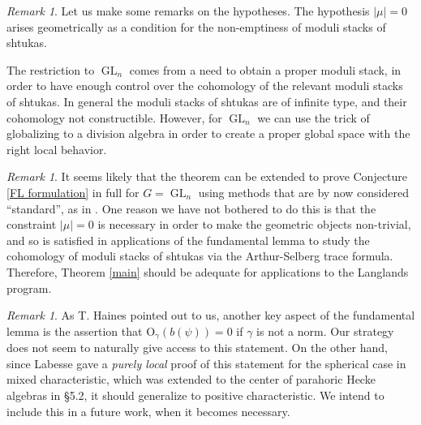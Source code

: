 \documentclass[reqno]{amsart}
\numberwithin{equation}{section}
\newcommand{\mrm}[1]{\mathrm{#1}}
\DeclareMathOperator{\GL}{GL}
\theoremstyle{remark}
\newtheorem{remark}[thm]{Remark}
\numberwithin{equation}{section}
\begin{document}
\begin{remark}
Let us make some remarks on the hypotheses. The hypothesis $|\mu| = 0$ arises geometrically as a condition for the  non-emptiness of moduli stacks of shtukas. 

The restriction to $\GL_n$ comes from a need to obtain a proper moduli stack, in order to have enough control over the cohomology of the relevant moduli stacks of shtukas. In general the moduli stacks of shtukas are of infinite type, and their cohomology not constructible. However, for $\GL_n$ we can use the trick of globalizing to a division algebra in order to create a proper global space with the right local behavior. 

\end{remark}



\begin{remark}
It seems likely that the theorem can be extended to prove Conjecture \ref{FL formulation} in full for $G = \GL_n$ using methods that are by now considered ``standard'', as in \cite{Clo90}. One reason we have not bothered to do this is that the constraint $|\mu|=0$ is necessary in order to make the geometric objects non-trivial, and so is satisfied in applications of the fundamental lemma to study the cohomology of moduli stacks of shtukas via the Arthur-Selberg trace formula. Therefore, Theorem \ref{main} should be adequate for applications to the Langlands program.  


\end{remark}

\begin{remark}
As T. Haines pointed out to us, another key aspect of the fundamental lemma is the assertion that $\mrm{O}_{\gamma}(b(\psi))= 0$ if $\gamma$ is not a norm. Our strategy does not seem to naturally give access to this statement. On the other hand, since Labesse gave a \emph{purely local} proof of this statement for the spherical case in mixed characteristic, which was extended to the center of parahoric Hecke algebras in \cite{Haines09} \S 5.2, it should generalize to positive characteristic. We intend to include this in a future work, when it becomes necessary. 	
\end{remark}
\end{document}
